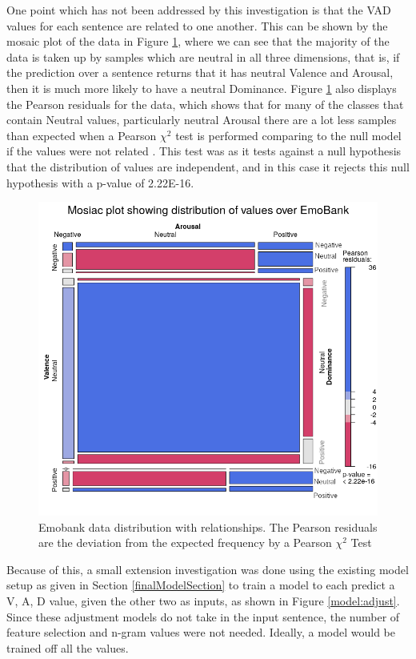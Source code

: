 One point which has not been addressed by this investigation is that the VAD values for each sentence are related to one another. This can be shown by the mosaic plot of the data in Figure \ref{mosaic:emo}, where we can see that the majority of the data is taken up by samples which are neutral in all three dimensions, that is, if the prediction over a sentence returns that it has neutral Valence and Arousal, then it is much more likely to have a neutral Dominance. Figure \ref{mosaic:emo} also displays the Pearson residuals for the data, which shows that for many of the classes that contain Neutral values, particularly neutral Arousal there are a lot less samples than expected when a Pearson $\chi^2$ test is performed comparing to the null model if the values were not related \cite{zeileis2007residual}. This test was as it tests against a null hypothesis that the distribution of values are independent, and in this case it rejects this null hypothesis with a p-value of 2.22E-16.
\begin{figure}[ht]
\centering
\includegraphics[scale=0.7]{graphs/mosaic_new.png}
\caption{Emobank data distribution with relationships. The Pearson residuals are the deviation from the expected frequency by a Pearson $\chi^2$ Test \cite{pearson1900x}}
\label{mosaic:emo}
\end{figure}

Because of this, a small extension investigation was done using the existing model setup as given in Section \ref{finalModelSection} to train a model to each predict a V, A, D value, given the other two as inputs, as shown in Figure \ref{model:adjust}. Since these adjustment models do not take in the input sentence, the number of feature selection and n-gram values were not needed. Ideally, a model would be trained off all the values.

